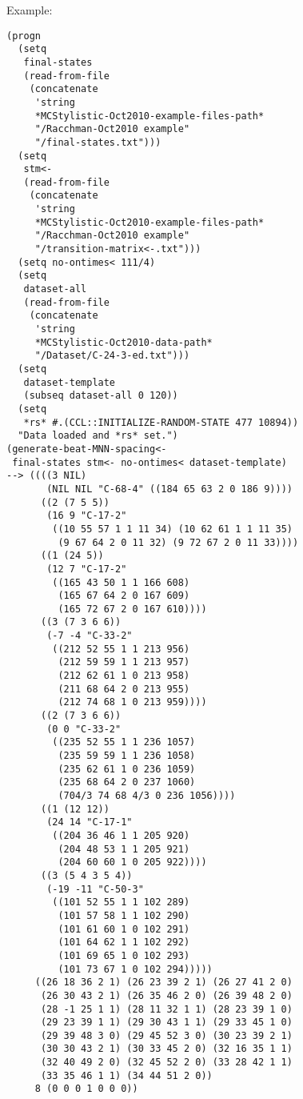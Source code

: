 \vspace{0.5cm}
\noindent Example:
\begin{verbatim}
(progn
  (setq
   final-states
   (read-from-file
    (concatenate
     'string
     *MCStylistic-Oct2010-example-files-path*
     "/Racchman-Oct2010 example"
     "/final-states.txt")))
  (setq
   stm<-
   (read-from-file
    (concatenate
     'string
     *MCStylistic-Oct2010-example-files-path*
     "/Racchman-Oct2010 example"
     "/transition-matrix<-.txt")))
  (setq no-ontimes< 111/4)
  (setq
   dataset-all
   (read-from-file
    (concatenate
     'string
     *MCStylistic-Oct2010-data-path*
     "/Dataset/C-24-3-ed.txt")))
  (setq
   dataset-template
   (subseq dataset-all 0 120))
  (setq
   *rs* #.(CCL::INITIALIZE-RANDOM-STATE 477 10894))
  "Data loaded and *rs* set.")
(generate-beat-MNN-spacing<-
 final-states stm<- no-ontimes< dataset-template)
--> ((((3 NIL)
       (NIL NIL "C-68-4" ((184 65 63 2 0 186 9))))
      ((2 (7 5 5))
       (16 9 "C-17-2"
        ((10 55 57 1 1 11 34) (10 62 61 1 1 11 35)
         (9 67 64 2 0 11 32) (9 72 67 2 0 11 33))))
      ((1 (24 5))
       (12 7 "C-17-2"
        ((165 43 50 1 1 166 608)
         (165 67 64 2 0 167 609)
         (165 72 67 2 0 167 610))))
      ((3 (7 3 6 6))
       (-7 -4 "C-33-2"
        ((212 52 55 1 1 213 956)
         (212 59 59 1 1 213 957)
         (212 62 61 1 0 213 958)
         (211 68 64 2 0 213 955)
         (212 74 68 1 0 213 959))))
      ((2 (7 3 6 6))
       (0 0 "C-33-2"
        ((235 52 55 1 1 236 1057)
         (235 59 59 1 1 236 1058)
         (235 62 61 1 0 236 1059)
         (235 68 64 2 0 237 1060)
         (704/3 74 68 4/3 0 236 1056))))
      ((1 (12 12))
       (24 14 "C-17-1"
        ((204 36 46 1 1 205 920)
         (204 48 53 1 1 205 921)
         (204 60 60 1 0 205 922))))
      ((3 (5 4 3 5 4))
       (-19 -11 "C-50-3"
        ((101 52 55 1 1 102 289)
         (101 57 58 1 1 102 290)
         (101 61 60 1 0 102 291)
         (101 64 62 1 1 102 292)
         (101 69 65 1 0 102 293)
         (101 73 67 1 0 102 294)))))
     ((26 18 36 2 1) (26 23 39 2 1) (26 27 41 2 0)
      (26 30 43 2 1) (26 35 46 2 0) (26 39 48 2 0)
      (28 -1 25 1 1) (28 11 32 1 1) (28 23 39 1 0)
      (29 23 39 1 1) (29 30 43 1 1) (29 33 45 1 0)
      (29 39 48 3 0) (29 45 52 3 0) (30 23 39 2 1)
      (30 30 43 2 1) (30 33 45 2 0) (32 16 35 1 1)
      (32 40 49 2 0) (32 45 52 2 0) (33 28 42 1 1)
      (33 35 46 1 1) (34 44 51 2 0))
     8 (0 0 0 1 0 0 0))
\end{verbatim}

